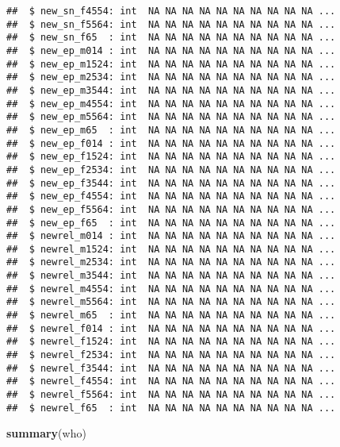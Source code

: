 \documentclass[]{article}
\newenvironment{Shaded}{\begin{snugshade}}{\end{snugshade}}
\newcommand{\KeywordTok}[1]{\textcolor[rgb]{0.13,0.29,0.53}{\textbf{#1}}}
\newcommand{\NormalTok}[1]{#1}
\begin{document}
\begin{verbatim}
##  $ new_sn_f4554: int  NA NA NA NA NA NA NA NA NA NA ...
##  $ new_sn_f5564: int  NA NA NA NA NA NA NA NA NA NA ...
##  $ new_sn_f65  : int  NA NA NA NA NA NA NA NA NA NA ...
##  $ new_ep_m014 : int  NA NA NA NA NA NA NA NA NA NA ...
##  $ new_ep_m1524: int  NA NA NA NA NA NA NA NA NA NA ...
##  $ new_ep_m2534: int  NA NA NA NA NA NA NA NA NA NA ...
##  $ new_ep_m3544: int  NA NA NA NA NA NA NA NA NA NA ...
##  $ new_ep_m4554: int  NA NA NA NA NA NA NA NA NA NA ...
##  $ new_ep_m5564: int  NA NA NA NA NA NA NA NA NA NA ...
##  $ new_ep_m65  : int  NA NA NA NA NA NA NA NA NA NA ...
##  $ new_ep_f014 : int  NA NA NA NA NA NA NA NA NA NA ...
##  $ new_ep_f1524: int  NA NA NA NA NA NA NA NA NA NA ...
##  $ new_ep_f2534: int  NA NA NA NA NA NA NA NA NA NA ...
##  $ new_ep_f3544: int  NA NA NA NA NA NA NA NA NA NA ...
##  $ new_ep_f4554: int  NA NA NA NA NA NA NA NA NA NA ...
##  $ new_ep_f5564: int  NA NA NA NA NA NA NA NA NA NA ...
##  $ new_ep_f65  : int  NA NA NA NA NA NA NA NA NA NA ...
##  $ newrel_m014 : int  NA NA NA NA NA NA NA NA NA NA ...
##  $ newrel_m1524: int  NA NA NA NA NA NA NA NA NA NA ...
##  $ newrel_m2534: int  NA NA NA NA NA NA NA NA NA NA ...
##  $ newrel_m3544: int  NA NA NA NA NA NA NA NA NA NA ...
##  $ newrel_m4554: int  NA NA NA NA NA NA NA NA NA NA ...
##  $ newrel_m5564: int  NA NA NA NA NA NA NA NA NA NA ...
##  $ newrel_m65  : int  NA NA NA NA NA NA NA NA NA NA ...
##  $ newrel_f014 : int  NA NA NA NA NA NA NA NA NA NA ...
##  $ newrel_f1524: int  NA NA NA NA NA NA NA NA NA NA ...
##  $ newrel_f2534: int  NA NA NA NA NA NA NA NA NA NA ...
##  $ newrel_f3544: int  NA NA NA NA NA NA NA NA NA NA ...
##  $ newrel_f4554: int  NA NA NA NA NA NA NA NA NA NA ...
##  $ newrel_f5564: int  NA NA NA NA NA NA NA NA NA NA ...
##  $ newrel_f65  : int  NA NA NA NA NA NA NA NA NA NA ...
\end{verbatim}

\begin{Shaded}
\begin{Highlighting}[]
\KeywordTok{summary}\NormalTok{(who)}
\end{Highlighting}
\end{Shaded}
\end{document}
